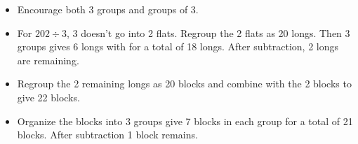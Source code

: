 \documentclass{ximera}
\begin{document}
\begin{teachingnote}
\begin{itemize}
\item Encourage both 3 groups and groups of 3.  
\item For $202\div 3$, 3 doesn't go into 2 flats.  Regroup the 2 flats as 20 longs.  Then 3 groups gives 6 longs with for a total of 18 longs.  After subtraction, 2 longs are remaining. 
\item Regroup the 2 remaining longs as 20 blocks and combine with the 2 blocks to give 22 blocks.  
\item Organize the blocks into 3 groups give 7 blocks in each group for a total of 21 blocks.  After subtraction 1 block remains.  
\end{itemize}
\end{teachingnote}
\end{document}
